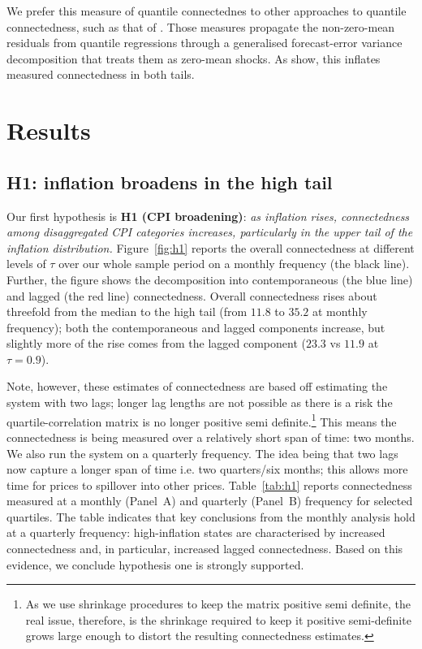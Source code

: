 \documentclass{article}
\begin{document}
We prefer this measure of  quantile connectednes to other approaches to quantile connectedness, such as that of \textcite{ando2022}. Those measures propagate the non-zero-mean residuals from quantile regressions through a generalised forecast-error variance decomposition that treats them as zero-mean shocks. As \textcite{shahzadetal} show, this inflates measured connectedness in both tails.


\section{Results}\label{sec:results}


\subsection{H1: inflation broadens in the high tail}
Our first hypothesis is \textbf{H1 (CPI broadening)}: \textit{as inflation rises,
connectedness among disaggregated CPI categories increases, particularly in the
upper tail of the inflation distribution.}  Figure~\ref{fig:h1} reports the overall
connectedness at different levels of $\tau$ over our whole sample period on a monthly frequency (the black line). Further, the  figure shows the decomposition into contemporaneous (the blue line) and lagged (the red line)
connectedness. Overall connectedness rises about threefold from the
median to the high tail (from $11.8$ to $35.2$ at monthly frequency); both the
contemporaneous and lagged components increase, but slightly more of the rise
comes from the lagged component ($23.3$ vs $11.9$ at $\tau=0.9$).  

Note, however, these estimates of connectedness  are based off estimating the system with two lags; longer lag lengths are not possible as there is a risk the quartile-correlation matrix is no longer positive semi definite.\footnote{As we use shrinkage procedures \citep{schafer2005} to keep the matrix positive semi definite, the real issue, therefore, is the shrinkage required to keep it positive semi-definite
grows large enough to distort the resulting connectedness estimates.}  This means the connectedness is being measured over a relatively short span of time: two months.   We also run the system on a quarterly frequency. The idea being that two lags now capture a longer span of time i.e. two quarters/six months; this allows more time for prices to spillover into other prices.  Table~\ref{tab:h1} reports connectedness measured at a monthly (Panel~A)
and quarterly (Panel~B) frequency for selected quartiles. The table indicates that key conclusions from the monthly analysis hold at a quarterly frequency: high-inflation states are characterised by increased connectedness and, in particular, increased lagged connectedness.  Based on this evidence, we conclude hypothesis one is strongly supported.
\end{document}
